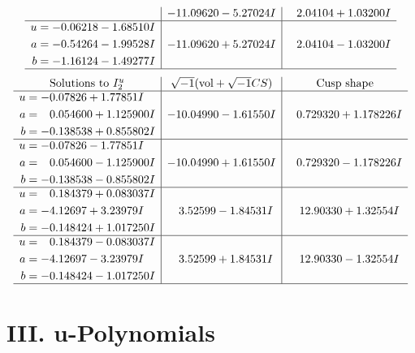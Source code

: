 \documentclass[1p]{elsarticle_modified}
\theoremstyle{definition}
\newcommand{\I}{\sqrt{-1}}
\begin{document}
$$\begin{array}{c|c|c}
 & -11.09620 - 5.27024 I & \phantom{-}2.04104 + 1.03200 I \\ \hline\begin{aligned}
u &= -0.06218 - 1.68510 I \\
a &= -0.54264 - 1.99528 I \\
b &= -1.16124 - 1.49277 I\end{aligned}
 & -11.09620 + 5.27024 I & \phantom{-}2.04104 - 1.03200 I\\
 \hline 
 \end{array}$$\newpage$$\begin{array}{c|c|c}  
\text{Solutions to }I^u_{2}& \I (\text{vol} + \sqrt{-1}CS) & \text{Cusp shape}\\
 \hline 
\begin{aligned}
u &= -0.07826 + 1.77851 I \\
a &= \phantom{-}0.054600 + 1.125900 I \\
b &= -0.138538 + 0.855802 I\end{aligned}
 & -10.04990 - 1.61550 I & \phantom{-}0.729320 + 1.178226 I \\ \hline\begin{aligned}
u &= -0.07826 - 1.77851 I \\
a &= \phantom{-}0.054600 - 1.125900 I \\
b &= -0.138538 - 0.855802 I\end{aligned}
 & -10.04990 + 1.61550 I & \phantom{-}0.729320 - 1.178226 I \\ \hline\begin{aligned}
u &= \phantom{-}0.184379 + 0.083037 I \\
a &= -4.12697 + 3.23979 I \\
b &= -0.148424 + 1.017250 I\end{aligned}
 & \phantom{-}3.52599 - 1.84531 I & \phantom{-}12.90330 + 1.32554 I \\ \hline\begin{aligned}
u &= \phantom{-}0.184379 - 0.083037 I \\
a &= -4.12697 - 3.23979 I \\
b &= -0.148424 - 1.017250 I\end{aligned}
 & \phantom{-}3.52599 + 1.84531 I & \phantom{-}12.90330 - 1.32554 I\\
 \hline 
 \end{array}$$\newpage
\newpage\renewcommand{\arraystretch}{1}
\centering \section*{ III. u-Polynomials}
\end{document}
